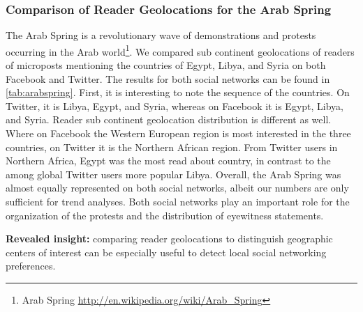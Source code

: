 \documentclass{iosart2c}
\begin{document}
\subsubsection{Comparison of Reader Geolocations for the Arab Spring}
The Arab Spring is a revolutionary wave of demonstrations and protests occurring in the Arab world\footnote{Arab Spring \url{http://en.wikipedia.org/wiki/Arab_Spring}}.
We compared sub continent geolocations of readers of microposts mentioning the countries of Egypt, Libya, and Syria on both Facebook and Twitter.
The results for both social networks can be found in \autoref{tab:arabspring}.
First, it is interesting to note the sequence of the countries.
On Twitter, it is Libya, Egypt, and Syria, whereas on Facebook it is Egypt, Libya, and Syria. 
Reader sub continent geolocation distribution is different as well.
Where on Facebook the Western European region is most interested in the three countries, on Twitter it is the Northern African region.
From Twitter users in Northern Africa, Egypt was the most read about country, in contrast to the among global Twitter users more popular Libya.
Overall, the Arab Spring was almost equally represented on both social networks, albeit our numbers are only sufficient for trend analyses.
Both social networks play an important role for the organization of the protests and the distribution of eyewitness statements.

\textbf{Revealed insight:}
comparing reader geolocations to distinguish geographic centers of interest can be especially useful to detect local social networking preferences.
\end{document}
